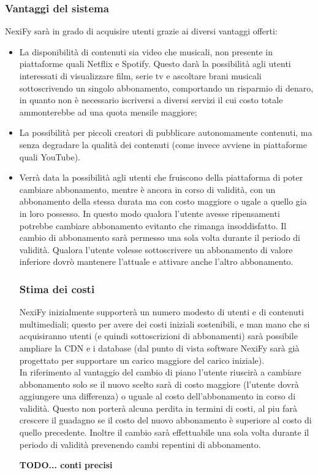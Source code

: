\subsubsection{Vantaggi del sistema}

NexiFy sarà in grado di acquisire utenti grazie ai diversi vantaggi offerti:
    \begin{itemize}
       	\item La disponibilità di contenuti sia video che musicali, non presente in piattaforme quali Netflix e Spotify. Questo darà la possibilità agli utenti interessati di visualizzare film, serie tv e ascoltare brani musicali sottoscrivendo un singolo abbonamento, comportando un risparmio di denaro, in quanto non è necessario iscriversi a diversi servizi il cui costo totale ammonterebbe ad una quota mensile maggiore;
        	\item La possibilità per piccoli creatori di pubblicare autonomamente contenuti, ma senza degradare la qualità dei contenuti (come invece avviene in piattaforme quali YouTube).
	\item\label{VantaggioSistema_cambioPiano} Verrà data la possibilità agli utenti che fruiscono della piattaforma di poter cambiare abbonamento, mentre è ancora in corso di validità, con un abbonamento della stessa durata ma con costo maggiore o ugale a quello gia in loro possesso. In questo modo qualora l'utente avesse ripensamenti potrebbe cambiare abbonamento evitanto che rimanga insoddisfatto. Il cambio di abbonamento sarà permesso una sola volta durante il periodo di validità. Qualora l'utente volesse sottoscrivere un abbonamento di valore inferiore dovrò mantenere l'attuale e attivare anche l'altro abbonamento.
\subsubsection{Stima dei costi}
NexiFy inizialmente supporterà un numero modesto di utenti e di contenuti multimediali; questo per avere dei costi iniziali sostenibili, e man mano che si acquisiranno utenti (e quindi sottoscrizioni di abbonamenti) sarà possibile ampliare la CDN e i database (dal punto di vista software NexiFy sarà già progettato per supportare un carico maggiore del carico iniziale).\\
In riferimento al vantaggio del cambio di piano l'utente riuscirà a cambiare abbonamento solo se il nuovo scelto sarà di costo maggiore (l'utente dovrà aggiungere una differenza) o uguale al costo dell'abbonamento in corso di validità. Questo non porterà alcuna perdita in termini di costi, al piu farà crescere il guadagno se il costo del nuovo abbonamento è superiore al costo di quello precedente. Inoltre il cambio sarà effettuabile una sola volta durante il periodo di validità prevenendo cambi repentini di abbonamento.

\textbf{TODO... conti precisi}

    \end{itemize}